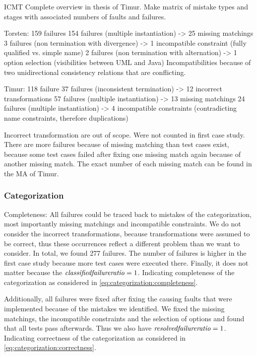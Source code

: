 \begin{copiedFrom}{ICMT}
Complete overview in thesis of Timur.
Make matrix of mistake types and stages with associated numbers of faults and failures.



Torsten: 159 failures
154 failures (multiple instantiation) -> 25 missing matchings
3 failures (non termination with divergence) -> 1 incompatible constraint (fully qualified vs. simple name)
2 failures (non termination with alternation) -> 1 option selection (visibilities between UML and Java)
Incompatibilities because of two unidirectional consistency relations that are conflicting.


Timur: 118 failure
37 failures (inconsistent termination) -> 12 incorrect transformations
57 failures (multiple instantiation) -> 13 missing matchings
24 failures (multiple instantiation) -> 4 incompatible constraints (contradicting name constraints, therefore duplications)

Incorrect transformation are out of scope. Were not counted in first case study.
There are more failures because of missing matching than test cases exist, because some test cases failed after fixing one missing match again because of another missing match.
The exact number of each missing match can be found in the MA of Timur.


\subsubsection{Categorization}

Completeness: All failures could be traced back to mistakes of the categorization, most importantly missing matchings and incompatible constraints.
We do not consider the incorrect transformations, because transformations were assumed to be correct, thus these occurrences reflect a different problem than we want to consider.
In total, we found 277 failures. The number of failures is higher in the first case study because more test cases were executed there.
Finally, it does not matter because the $\mathit{classified failure ratio} = 1$.
Indicating completeness of the categorization as considered in \autoref{eq:categorization:completeness}.

Additionally, all failures were fixed after fixing the causing faults that were implemented because of the mistakes we identified.
We fixed the missing matchings, the incompatible constraints and the selection of options and found that all tests pass afterwards.
Thus we also have $\mathit{resolved failure ratio} = 1$.
Indicating correctness of the categorization as considered in \autoref{eq:categorization:correctness}.


\end{copiedFrom}
